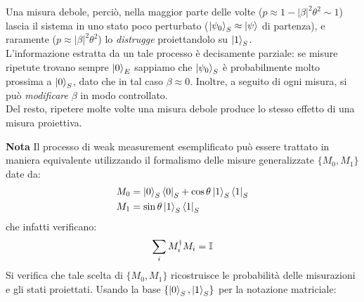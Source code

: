 \documentclass[../../InformazioneQuantistica.tex]{subfiles}
\begin{document}
Una misura debole, perciò,  nella maggior parte delle volte ($p\approx 1-|\beta|^2 \theta^2 \sim 1$) lascia il sistema in uno stato poco perturbato ($\Ket{\psi_0}_S \approx \Ket{\psi}$ di partenza), e raramente ($p\approx |\beta|^2 \theta^2$) lo \textit{distrugge} proiettandolo su $\Ket{1}_S$.\\
L'informazione estratta da un tale processo è decisamente parziale: se misure ripetute trovano sempre $\Ket{0}_E$ sappiamo che $\Ket{\psi_0}_S$ è probabilmente molto prossima a $\Ket{0}_S$, dato che in tal caso $\beta \approx 0$. Inoltre, a seguito di ogni misura, si può \textit{modificare} $\beta$ in modo controllato.\\
Del resto, ripetere molte volte una misura debole produce lo stesso effetto di una misura proiettiva.


\textbf{Nota} Il processo di weak measurement esemplificato può essere trattato in maniera equivalente utilizzando il formalismo delle misure generalizzate $\{M_0, M_1\}$ date da:
\begin{align*}
M_0 &= \Ket{0}_S\Bra{0}_S + \cos\theta \Ket{1}_S\Bra{1}_S\\
M_1 &= \sin\theta \Ket{1}_S\Bra{1}_S
\end{align*}
che infatti verificano:
\begin{align*}
\sum_i M_i^\dag M_i = \mathbb{I}
\end{align*}
Si verifica che tale scelta di $\{M_0, M_1\}$ ricostruisce le probabilità delle misurazioni e gli stati proiettati. Usando la base $\{\Ket{0}_S, \Ket{1}_S\}$ per la notazione matriciale:
\end{document}
